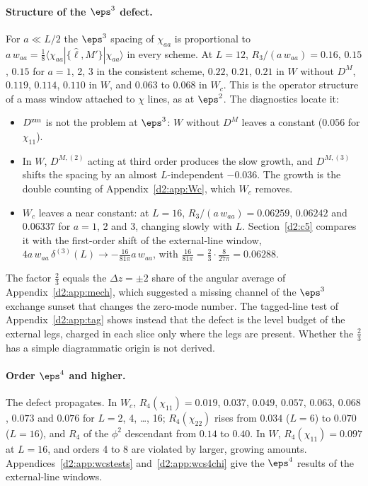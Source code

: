 \paragraph{Structure of the $\eps^3$ defect.} For $a\ll L/2$ the $\eps^3$ spacing of $\chi_{aa}$ is proportional to
$a\,w_{aa}=\frac18\langle\chi_{aa}|\{\hat\ell,M'\}|\chi_{aa}\rangle$ in every scheme. At $L=12$, $R_3/(a\,w_{aa})=0.16$, $0.15$,
$0.15$ for $a=1$, 2, 3 in the consistent scheme, $0.22$, $0.21$, $0.21$ in $W$ without $D^M$, $0.119$, $0.114$, $0.110$ in $W$,
and $0.063$ to $0.068$ in $W_c$. This is the operator structure of a mass window attached to $\chi$ lines, as at $\eps^2$. The
diagnostics locate it:
\begin{itemize}
\item $D^{\rm zm}$ is not the problem at $\eps^3$: $W$ without $D^M$ leaves a constant ($0.056$ for $\chi_{11}$).
\item In $W$, $D^{M,(2)}$ acting at third order produces the slow growth, and $D^{M,(3)}$ shifts the spacing by an almost
 $L$-independent $-0.036$. The growth is the double counting of Appendix~\ref{d2:app:Wc}, which $W_c$ removes.
\item $W_c$ leaves a near constant: at $L=16$, $R_3/(a\,w_{aa})=0.06259$, $0.06242$ and $0.06337$ for $a=1$, 2 and 3,
 changing slowly with $L$. Section~\ref{d2:c5} compares it with the first-order shift of the external-line window,
 $4a\,w_{aa}\,\delta^{(3)}(L)\to-\frac{16}{81\pi}a\,w_{aa}$, with $\frac{16}{81\pi}=\frac23\cdot\frac8{27\pi}=0.06288$.
\end{itemize}
The factor $\frac23$ equals the $\Delta z=\pm2$ share of the angular average of Appendix~\ref{d2:app:mech}, which suggested a
missing channel of the $\eps^3$ exchange sunset that changes the zero-mode number. The tagged-line test of
Appendix~\ref{d2:app:tag} shows instead that the defect is the level budget of the external legs, charged in each slice only
where the legs are present. Whether the $\frac23$ has a simple diagrammatic origin is not derived.

\paragraph{Order $\eps^4$ and higher.} The defect propagates. In $W_c$, $R_4(\chi_{11})=0.019$, $0.037$, $0.049$, $0.057$,
$0.063$, $0.068$, $0.073$ and $0.076$ for $L=2$, 4, \dots, 16; $R_4(\chi_{22})$ rises from $0.034$ ($L=6$) to $0.070$ ($L=16$), and
$R_4$ of the $\phi^2$ descendant from $0.14$ to $0.40$. In $W$, $R_4(\chi_{11})=0.097$ at $L=16$, and orders 4 to 8 are
violated by larger, growing amounts. Appendices~\ref{d2:app:wcstests} and~\ref{d2:app:wcs4chi} give the $\eps^4$ results of
the external-line windows.

